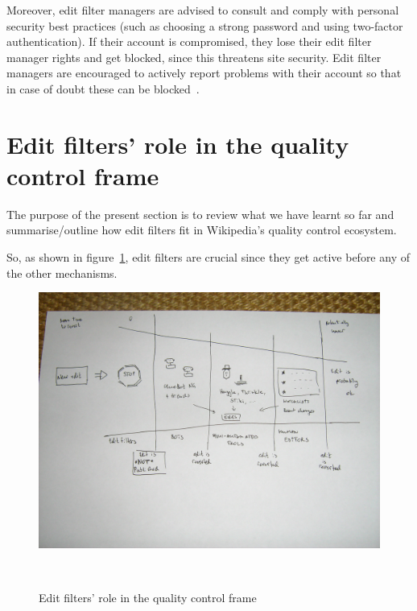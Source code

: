 Moreover, edit filter managers are advised to consult and comply with personal security best practices (such as choosing a strong password and using two-factor authentication).
If their account is compromised, they lose their edit filter manager rights and get blocked, since this threatens site security.
Edit filter managers are encouraged to actively report problems with their account so that in case of doubt these can be blocked~\cite{Wikipedia:EditFilter}.


\section{Edit filters' role in the quality control frame}

The purpose of the present section is to review what we have learnt so far and summarise/outline how edit filters fit in Wikipedia's quality control ecosystem.

So, as shown in figure~\ref{fig:funnel-with-filters}, edit filters are crucial since they get active before any of the other mechanisms.

\begin{figure}
\centering
  \includegraphics[width=0.9\columnwidth]{pics/funnel-diagramm-with-filters.JPG}
  \caption{Edit filters' role in the quality control frame}~\label{fig:funnel-with-filters}
\end{figure}

